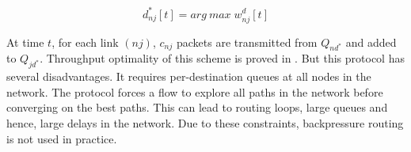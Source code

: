 \begin{equation}
d^{*}_{nj}[t] = arg\:max\;{w_{nj}^{d}[t]}
\end{equation}

At time $t$, for each link $(nj)$, $c_{nj}$ packets are transmitted from $Q_{nd^{*}}$ and added to $Q_{jd^{*}}$. Throughput optimality of this scheme is proved in \cite{BP-orig}. But this protocol has several disadvantages. It requires per-destination queues at all nodes in the network. The protocol forces a flow to explore all paths in the network before converging on the best paths. This can lead to routing loops, large queues and hence, large delays in the network. Due to these constraints, backpressure routing is not used in practice.

%
%
%

